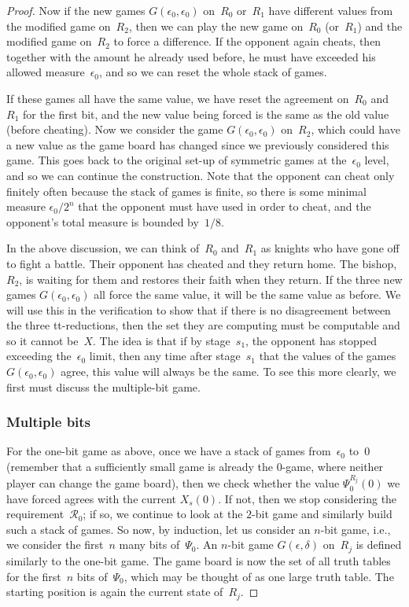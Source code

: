 \documentclass{LMCS}
\newcommand{\0}{\mathbf{0}}
\newcommand{\<}{\langle}
\renewcommand{\>}{\rangle}
\begin{document}
\begin{proof}
Now if the new games $G(\epsilon_0,\epsilon_0)$ on~$R_0$ or~$R_1$ have
different values from the modified game on~$R_2$, then we can play the new
game on~$R_0$ (or~$R_1$) and the modified game on~$R_2$ to force a
difference. If the opponent again cheats, then together with the amount he
already used before, he must have exceeded his allowed measure~$\epsilon_0$,
and so we can reset the whole stack of games.

If these games all have the same value, we have reset the agreement on~$R_0$
and~$R_1$ for the first bit, and the new value being forced is the same as
the old value (before cheating). Now we consider the game
$G(\epsilon_0,\epsilon_0)$ on~$R_2$, which could have a new value as the game
board has changed since we previously considered this game. This goes back to
the original set-up of symmetric games at the~$\epsilon_0$ level, and so we
can continue the construction.  Note that the opponent can cheat only
finitely often because the stack of games is finite, so there is some minimal
measure $\epsilon_0/{2^n}$ that the opponent must have used in order to
cheat, and the opponent's total measure is bounded by~$1/8$.

In the above discussion, we can think of~$R_0$ and~$R_1$ as knights who have
gone off to fight a battle.  Their opponent has cheated and they return home.
The bishop,~$R_2$, is waiting for them and restores their faith when they
return.  If the three new games $G(\epsilon_0,\epsilon_0)$ all force the same
value, it will be the same value as before.  We will use this in the
verification to show that if there is no disagreement between the three
tt-reductions, then the set they are computing must be computable and so it
cannot be~$X$.  The idea is that if by stage~$s_1$, the opponent has stopped
exceeding the~$\epsilon_0$ limit, then any time after stage~$s_1$ that the
values of the games $G(\epsilon_0, \epsilon_0)$ agree, this value will always
be the same.  To see this more clearly, we first must discuss the
multiple-bit game.

\subsubsection{Multiple bits}\label{multiple bits}

For the one-bit game as above, once we have a stack of games
from~$\epsilon_0$ to~$0$ (remember that a sufficiently small game is already
the $0$-game, where neither player can change the game board), then we check
whether the value $\Psi_0^{R_j}(0)$ we have forced agrees with the current
$X_s(0)$. If not, then we stop considering the requirement~$\mathcal{R}_0$;
if so, we continue to look at the $2$-bit game and similarly build such a
stack of games. So now, by induction, let us consider an $n$-bit game, i.e.,
we consider the first~$n$ many bits of~$\Psi_0$.
An $n$-bit game $G(\epsilon,\delta)$ on~$R_j$ is defined similarly to the
one-bit game.  The game board is now the set of all truth tables for the
first~$n$ bits of~$\Psi_0$, which may be thought of as one large truth table.
The starting position is again the current state of~$R_j$.


\end{proof}
\end{document}
